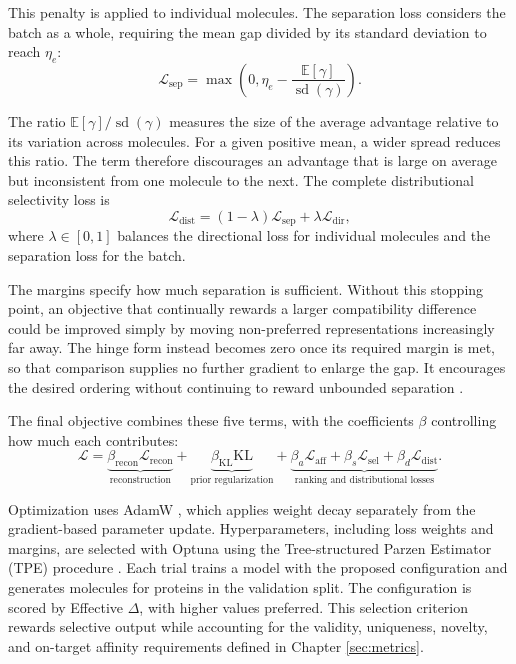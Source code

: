 \documentclass[a4paper,12pt]{article}
\begin{document}
This penalty is applied to individual molecules. The separation loss considers the batch as a whole, requiring the mean gap divided by its standard deviation to reach $\eta_e$:
\begin{equation*}
    \mathcal{L}_{\mathrm{sep}}
    =
    \max
    \left(
    0,
    \eta_e
    -
    \frac{
        \mathbb{E}[\gamma]
    }{
        \operatorname{sd}(\gamma)
    }
    \right).
\end{equation*}

The ratio $\mathbb{E}[\gamma]/\operatorname{sd}(\gamma)$ measures the size of the average advantage relative to its variation across molecules. For a given positive mean, a wider spread reduces this ratio. The term therefore discourages an advantage that is large on average but inconsistent from one molecule to the next. The complete distributional selectivity loss is
\begin{equation*}
    \mathcal{L}_{\mathrm{dist}}
    =
    (1-\lambda)
    \mathcal{L}_{\mathrm{sep}}
    +
    \lambda
    \mathcal{L}_{\mathrm{dir}},
\end{equation*}
where $\lambda\in[0,1]$ balances the directional loss for individual molecules and the separation loss for the batch.

The margins specify how much separation is sufficient. Without this stopping point, an objective that continually rewards a larger compatibility difference could be improved simply by moving non-preferred representations increasingly far away. The hinge form instead becomes zero once its required margin is met, so that comparison supplies no further gradient to enlarge the gap. It encourages the desired ordering without continuing to reward unbounded separation \parencite{Hadsell_Chopra_LeCun_2006}.

The final objective combines these five terms, with the coefficients $\beta$ controlling how much each contributes:
\begin{equation}
    \label{eq:full_loss}
    \mathcal{L}=\underbrace{
        \beta_{\mathrm{recon}}\mathcal{L}_{\mathrm{recon}}
    }_{\text{reconstruction}} +
    \underbrace{
        \beta_{\mathrm{KL}}\mathrm{KL}
    }_{\text{prior regularization}} +
    \underbrace{
        \beta_a\mathcal{L}_{\mathrm{aff}}
        +
        \beta_s\mathcal{L}_{\mathrm{sel}}
        +
        \beta_d\mathcal{L}_{\mathrm{dist}}
    }_{\text{ranking and distributional losses}}.
\end{equation}

Optimization uses AdamW \parencite{Loshchilov_Hutter_2019}, which applies weight decay separately from the gradient-based parameter update. Hyperparameters, including loss weights and margins, are selected with Optuna \parencite{Akiba_Sano_Yanase_Ohta_Koyama_2019} using the Tree-structured Parzen Estimator (TPE) procedure \parencite{Bergstra_Bardenet_Bengio_Kegl_2011}. Each trial trains a model with the proposed configuration and generates molecules for proteins in the validation split. The configuration is scored by Effective $\Delta$, with higher values preferred. This selection criterion rewards selective output while accounting for the validity, uniqueness, novelty, and on-target affinity requirements defined in Chapter \ref{sec:metrics}.
\end{document}

